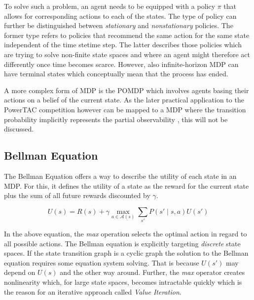 To solve such a problem, an agent needs to be equipped with a policy $\pi$ that allows for corresponding actions to each
of the states. The type of policy can further be distinguished between \emph{stationary} and \emph{nonstationary}
policies. The former type refers to policies that recommend the same action for the same state independent of the
time stetime step. The latter describes those policies which are trying to solve non-finite state spaces and where an
agent might therefore act differently once time becomes scarce. However, also infinite-horizon \ac {MDP} can have
terminal states which conceptually mean that the process has ended.

A more complex form of \ac {MDP} is the \ac {POMDP} which involves agents basing their actions on a belief of the
current state. As the later practical application to the \ac {PowerTAC} competition however can be mapped to a \ac {MDP}
where the transition probability implicitly represents the partial observability \citep{tactexurieli2016mdp}, this will not be discussed. 

\subsection{Bellman Equation}%
\label{ssub:bellman_equation}

The Bellman Equation offers a way to describe the utility of each state in an \ac {MDP}. For this, it defines the
utility of a state as the reward for the current state plus the sum of all future rewards discounted by $\gamma$. 

\begin{equation}
U(s) = R(s) + \gamma \max_{a\in\mathcal{A}(s)} \sum_{s'}{P(s' \mid s,a)U(s')}
\end{equation}

In the above equation, the \emph{max} operation selects the optimal action in regard to all possible actions. The
Bellman equation is explicitly targeting \emph{discrete} state spaces. If the state transition graph is a cyclic graph
the solution to the Bellman equation requires some equation system solving. That is because $U(s')$ may depend on $U(s)$
and the other way around. Further, the \emph{max} operator creates nonlinearity which, for large state spaces, becomes 
intractable quickly which is the reason for an iterative approach called \emph{Value Iteration}.



